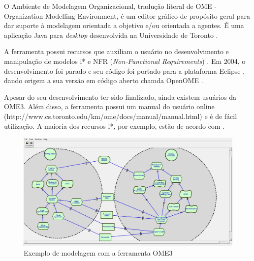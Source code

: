                 O Ambiente de Modelagem Organizacional, tradução literal de OME - Organization Modelling Environment, é um editor gráfico de propósito geral para dar suporte à modelagem orientada a objetivo e/ou orientada a agentes.
                É uma aplicação Java para \emph{desktop} desenvolvida na Universidade de Toronto \cite{ome2013}.

                A ferramenta possui recursos que auxiliam o usuário no desenvolvimento e manipulação de modelos i* e NFR (\emph{Non-Functional Requirements}) \cite{chung2000non}.
                Em 2004, o desenvolvimento foi parado e seu código foi portado para a plataforma Eclipse \cite{eclipse}, dando origem a sua versão em código aberto chamda OpenOME \cite{horkoff2011openome}.

                Apesar do seu desenvolvimento ter sido finalizado, ainda existem usuários da OME3.
                Além disso, a ferramenta possui um manual do usuário online (http://www.cs.toronto.edu/km/ome/docs/manual/manual.html) e é de fácil utilização. A maioria dos recursos i*, por exemplo, estão de acordo com \cite{yu1995modelling}.

                \begin{figure}[h!]
                    \centering
                        \includegraphics[width=0.8\linewidth]{Figuras/istar/tela-ome.jpg}
                        \caption{Exemplo de modelagem com a ferramenta OME3}
                        \label{fig:tela-ome}
                \end{figure}

